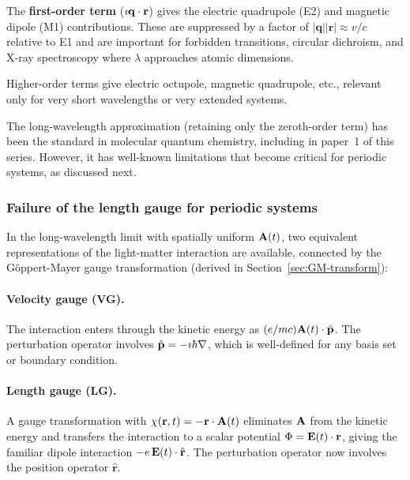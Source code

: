 The \textbf{first-order term} ($\imath\mathbf{q}\cdot\mathbf{r}$)
gives the electric quadrupole (E2) and magnetic dipole (M1)
contributions.  These are suppressed by a factor of
$|\mathbf{q}||\mathbf{r}| \approx v/c$ relative to E1 and are
important for forbidden transitions, circular dichroism, and X-ray
spectroscopy where $\lambda$ approaches atomic dimensions.

Higher-order terms give electric octupole, magnetic quadrupole,
etc., relevant only for very short wavelengths or very extended
systems.

The long-wavelength approximation (retaining only the zeroth-order
term) has been the standard in molecular quantum chemistry, including
in paper~1 of this series.\cite{jakowski-tddft-2025}
However, it has well-known limitations that become critical for
periodic systems, as discussed next.


\subsubsection{Failure of the length gauge for periodic systems}
\label{sec:lg-failure}

In the long-wavelength limit with spatially uniform $\mathbf{A}(t)$, two
equivalent representations of the light-matter interaction are
available, connected by the G\"{o}ppert-Mayer gauge transformation
(derived in Section~\ref{sec:GM-transform}):

\paragraph{Velocity gauge (VG).}
The interaction enters through the kinetic energy as
$(e/mc)\mathbf{A}(t)\cdot\hat{\mathbf{p}}$.  The perturbation operator involves
$\hat{\mathbf{p}} = -\imath\hbar\nabla$, which is well-defined for any basis
set or boundary condition.

\paragraph{Length gauge (LG).}
A gauge transformation with $\chi(\mathbf{r},t)
= -\mathbf{r}\cdot\mathbf{A}(t)$ eliminates $\mathbf{A}$ from the kinetic
energy and transfers the interaction to a scalar potential
$\Phi = \mathbf{E}(t)\cdot\mathbf{r}$, giving the familiar dipole
interaction $-e\,\mathbf{E}(t)\cdot\hat{\mathbf{r}}$.  The perturbation
operator now involves the position operator $\hat{\mathbf{r}}$.

